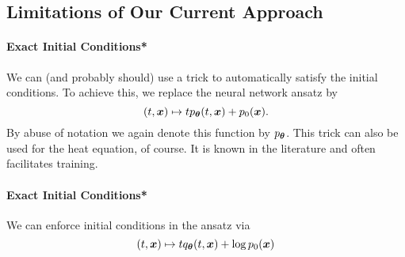 \subsection{Limitations of Our Current Approach}

\paragraph{Exact Initial Conditions*}
We can (and probably should) use a trick to automatically satisfy the initial conditions. To achieve this, we replace the neural network ansatz by
\begin{equation}
  (t,{\bm{x}})
  \mapsto
  t p_{\bm{\theta}}(t,{\bm{x}}) + p_0({\bm{x}}).
\end{equation}
By abuse of notation we again denote this function by $p_{\bm{\theta}}$. This trick can also be used for the heat equation, of course. It is known in the literature and often facilitates training. 

\paragraph{Exact Initial Conditions*}
We can enforce initial conditions in the ansatz via
\begin{equation*}
  (t,{\bm{x}}) \mapsto t q_{\bm{\theta}}(t, {\bm{x}}) + \log p_0({\bm{x}})
\end{equation*}

